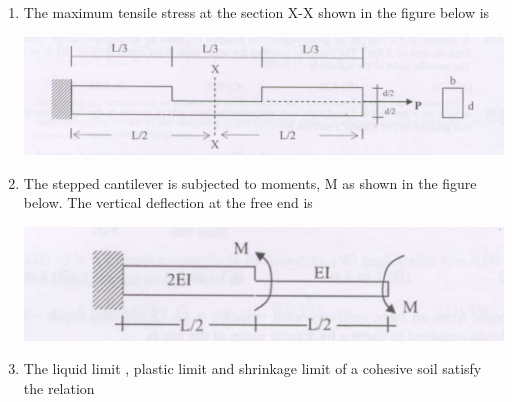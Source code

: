 \documentclass[journal]{IEEEtran}
\begin{document}
\begin{enumerate}
\item The maximum tensile stress at the section X-X shown in the figure below is \hfill {}

\includegraphics[width=0.6\columnwidth]{figs/fig2.png} 
\begin{enumerate}
\end{enumerate}

\item The stepped cantilever is subjected to moments, M as shown in the figure below. The vertical deflection at the free end  is \hfill {}

\includegraphics[width=0.6\columnwidth]{figs/fig3.png} 
\begin{enumerate}
\end{enumerate}

\item The liquid limit , plastic limit  and shrinkage limit  of a cohesive soil satisfy the relation \hfill {}


\end{enumerate}
\end{document}
